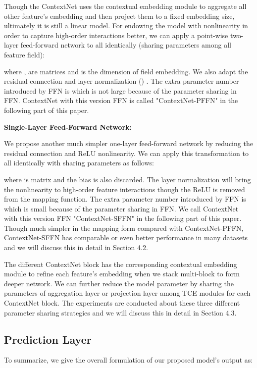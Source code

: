 \documentclass[sigconf]{acmart}
\begin{document}
Though the ContextNet uses the contextual embedding module to aggregate all other feature's embedding and then project them to a fixed embedding size, ultimately it is still a linear model. For endowing the model with nonlinearity in order to capture high-order interactions better, we can apply a point-wise two-layer feed-forward network to all  identically (sharing parameters among all feature field):

where ,  are  matrices and  is the dimension of field embedding. We also adapt the residual connection and layer normalization () \cite{ba2016layer}. The extra  parameter number  introduced by FFN is  which is not large because of the parameter sharing in FFN. ContextNet with this version FFN is called "ContextNet-PFFN" in the following part of this paper.




\noindent\textbf{Single-Layer Feed-Forward Network:}



We propose another much simpler one-layer feed-forward network by reducing the residual connection and ReLU nonlinearity. We can apply this transformation to all  identically with sharing parameters as follows:




\noindent where  is  matrix and the bias is also discarded. The layer normalization will bring the nonlinearity to high-order feature interactions though the ReLU is removed from the mapping function. The extra  parameter number introduced by FFN is  which is small because of the parameter sharing in FFN. We call ContextNet with this version FFN "ContextNet-SFFN" in the following part of this paper. Though much simpler in the mapping form compared with ContextNet-PFFN,  ContextNet-SFFN has comparable or even better performance in many datasets and we will discuss this in detail in Section 4.2.


The different ContextNet block has the corresponding contextual embedding module to refine each feature's embedding when we stack multi-block to form deeper network. We can further reduce the model parameter by sharing the parameters of aggregation layer or projection layer among TCE modules for each ContextNet block. The experiments are conducted about these three different parameter sharing strategies and we will discuss this in detail in Section 4.3.




\subsection{Prediction Layer}
To summarize, we give the overall formulation of our proposed model's output as:
  
\end{document}

